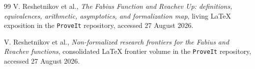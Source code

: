 \documentclass[11pt]{article}
\theoremstyle{definition}
\theoremstyle{remark}
\begin{document}
\begin{thebibliography}{99}
V. Reshetnikov et al.,
\newblock \emph{The Fabius Function and Rvachev Up: definitions, equivalences, arithmetic,
asymptotics, and formalization map},
\newblock living LaTeX exposition in the \texttt{ProveIt} repository, accessed 27 August 2026.

V. Reshetnikov et al.,
\newblock \emph{Non-formalized research frontiers for the Fabius and Rvachev functions},
\newblock consolidated LaTeX frontier volume in the \texttt{ProveIt} repository, accessed
27 August 2026.

\end{thebibliography}
\end{document}
